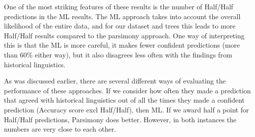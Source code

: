 \documentclass[a4paper,10pt]{article} %
\begin{document}



One of the most striking features of these results is the number of Half/Half predictions in the ML results. The ML approach takes into account the overall likelihood of the entire data, and for our dataset and trees this leads to more Half/Half results compared to the parsimony approach. One way of interpreting this is that the ML is more careful, it makes fewer confident predictions (more than 60\% either way), but it also disagrees less often with the findings from historical linguistics.

As was discussed earlier, there are several different ways of evaluating the performance of these approaches. If we consider how often they made a prediction that agreed with historical linguistics out of all the times they made a confident prediction (Accuracy score excl Half/Half), then ML. If we award half a point for Half/Half predictions, Parsimony does better. However, in both instances the numbers are very close to each other.


\end{document}
